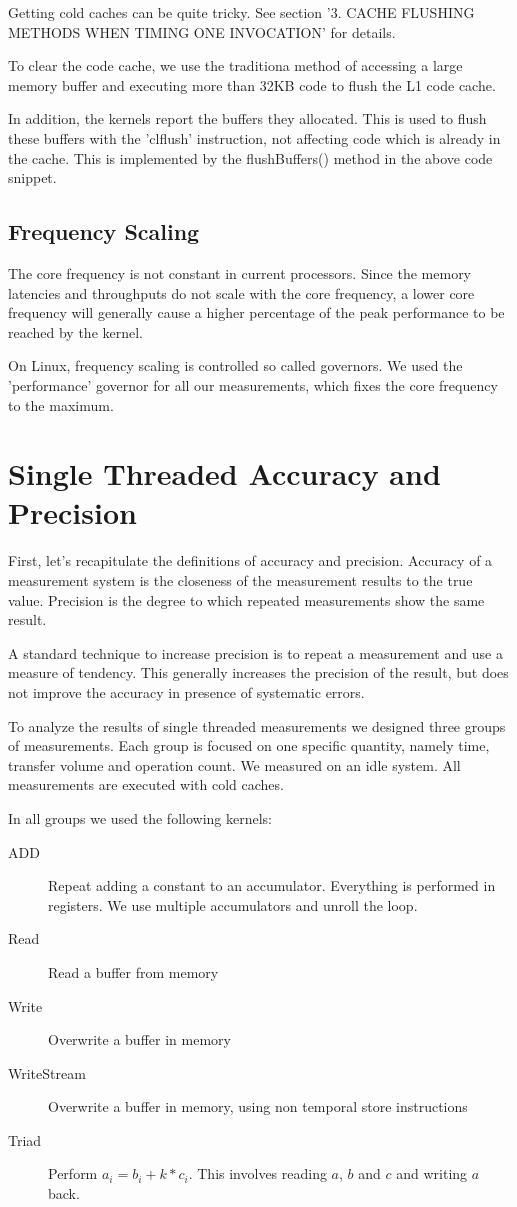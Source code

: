 \documentclass[a4paper,12pt]{article}
\newcommand{\method}[1]{\textsf{#1}}
\begin{document}
Getting cold caches can be quite tricky. See
\cite{Whaley:2008:AAC:1462062.1462065} section '3.
CACHE FLUSHING METHODS WHEN TIMING ONE INVOCATION' for details.

To clear the code cache, we use the traditiona method of accessing a large
memory buffer and executing more than 32KB code to flush the L1 code cache.

In addition, the kernels report the buffers they allocated. This is used to
flush these buffers with the 'clflush' instruction, not affecting code which is
already in the cache. This is implemented by the \method{flushBuffers()}
method in the above code snippet.

\subsection{Frequency Scaling}
The core frequency is not constant in current processors. Since the memory
latencies and throughputs do not scale with the core frequency, a lower core
frequency will generally cause a higher percentage of the peak performance to be
reached by the kernel.

On Linux, frequency scaling is controlled so called governors. We used the
'performance' governor for all our measurements, which fixes the core frequency
to the maximum.

\section{Single Threaded Accuracy and Precision}
First, let's recapitulate the definitions of accuracy and precision.
\cite{accuracyAndPrecision} Accuracy of a measurement system is the closeness of
the measurement results to the true value.
Precision is the degree to which repeated measurements show the same result.

A standard technique to increase precision is to repeat a measurement and use
a measure of tendency. This generally increases the precision of the result, but
does not improve the accuracy in presence of systematic errors.

To analyze the results of single threaded measurements we designed three groups
of measurements. Each group is focused on one specific quantity, namely time,
transfer volume and operation count. We measured on an idle system. All
measurements are executed with cold caches.

In all groups we used the following kernels:
\begin{description}
\item[ADD] Repeat adding a constant to an accumulator. Everything is performed
in registers. We use multiple accumulators and unroll the loop. 
\item[Read] Read a buffer from memory
\item[Write] Overwrite a buffer in memory
\item[WriteStream] Overwrite a buffer in memory, using non temporal store
instructions
\item[Triad] Perform $a_i=b_i+k*c_i$. This involves reading $a$, $b$ and $c$ and
writing $a$ back.
\end{description}
\end{document}
